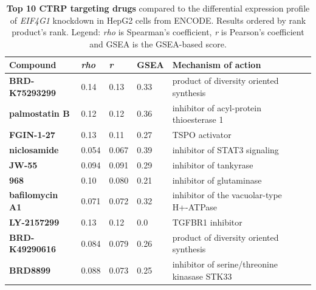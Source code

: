 \begin{table}[!h]
\centering
\footnotesize
\caption[Top 10 CTRP 2.1 targeting drugs]{\textbf{Top 10 CTRP targeting drugs} compared to the differential expression profile of \emph{EIF4G1} knockdown in HepG2 cells from ENCODE. Results ordered by rank product's rank. Legend: \emph{rho} is Spearman's coefficient, \emph{r} is Pearson's coefficient and GSEA is the GSEA-based score.}
\label{tab:eif4g1-ctrp}

\begin{tabular}{llllll}
\toprule
\textbf{Compound}           & \textbf{\emph{rho}} & \textbf{\emph{r}} & \textbf{GSEA} & \textbf{Mechanism of action}                                                         \\
\midrule
\textbf{BRD-K75293299}  & 0.14                    & 0.13                   & 0.33          & product of diversity oriented synthesis                              \\
\textbf{palmostatin B}  & 0.12                    & 0.12                   & 0.36          & inhibitor of acyl-protein thioesterase 1                             \\
\textbf{FGIN-1-27}      & 0.13                    & 0.11                   & 0.27          & TSPO activator \\
\textbf{niclosamide}    & 0.054                   & 0.067                  & 0.39          & inhibitor of STAT3 signaling                                         \\
\textbf{JW-55}          & 0.094                   & 0.091                  & 0.29          & inhibitor of tankyrase                                               \\
\textbf{968}            & 0.10                    & 0.080                  & 0.21          & inhibitor of glutaminase                                             \\
\textbf{bafilomycin A1} & 0.071                   & 0.072                  & 0.32          & inhibitor of the vacuolar-type H+-ATPase                             \\
\textbf{LY-2157299}     & 0.13                    & 0.12                   & 0.0           & TGFBR1 inhibitor      \\
\textbf{BRD-K49290616}  & 0.084                   & 0.079                  & 0.26          & product of diversity oriented synthesis                              \\
\textbf{BRD8899}        & 0.088                   & 0.073                  & 0.25          & inhibitor of serine/threonine kinasase STK33                        \\
\bottomrule
\end{tabular}
\end{table}

